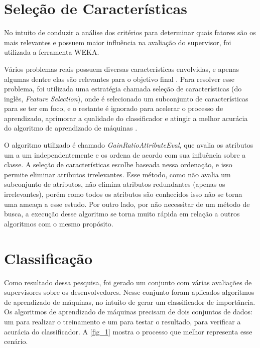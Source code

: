 \section{Seleção de Características}\label{secao3.3}

No intuito de conduzir a análise dos critérios para determinar quais fatores são os mais relevantes e possuem maior influência na avaliação do supervisor, foi utilizada a ferramenta WEKA.

Vários problemas reais possuem diversas características envolvidas, e apenas algumas dentre elas são relevantes para o objetivo final \cite{Kira1992}. Para resolver esse problema, foi utilizada uma estratégia chamada seleção de características (do inglês, \textit{Feature Selection}), onde é selecionado um subconjunto de características para se ter em foco, e o restante é ignorado para acelerar o processo de aprendizado, aprimorar a qualidade do classificador e atingir a melhor acurácia do algoritmo de aprendizado de máquinas \cite{Kira1992,Kohavi1997}. 

O algoritmo utilizado é chamado \textit{GainRatioAttributeEval}, que avalia os atributos um a um independentemente e os ordena de acordo com sua influência sobre a classe. A seleção de características escolhe baseada nessa ordenação, e isso permite eliminar atributos irrelevantes. Esse método, como não avalia um subconjunto de atributos, não elimina atributos redundantes (apenas os irrelevantes), porém como todos os atributos são conhecidos isso não se torna uma ameaça a esse estudo. Por outro lado, por não necessitar de um método de busca, a execução desse algoritmo se torna muito rápida em relação a outros algoritmos com o mesmo propósito.

\section{Classificação}\label{secao3.4}

Como resultado dessa pesquisa, foi gerado um conjunto com várias avaliações de supervisores sobre os desenvolvedores. Nesse conjunto foram aplicados algoritmos de aprendizado de máquinas, no intuito de gerar um classificador de importância. Os algoritmos de aprendizado de máquinas precisam de dois conjuntos de dados: um para realizar o treinamento e um para testar o resultado, para verificar a acurácia do classificador. A \autoref{fig_1} mostra o processo que melhor representa esse cenário.


